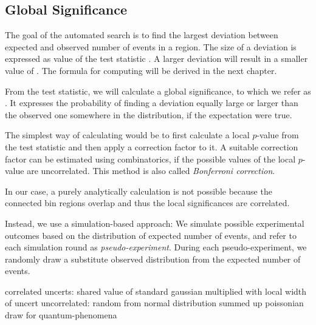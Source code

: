 \subsection{Global Significance}
\label{sec:global_significance}

The goal of the automated search is to find the largest deviation between expected and observed number of events in a region. The size of a deviation is expressed as value of the test statistic \TS. A larger deviation will result in a smaller value of \TS.
The formula for computing \TS will be derived in the next chapter. 

From the test statistic, we will calculate a global significance, to which we refer as \ptilde. It expresses the probability of finding a deviation equally large or larger than the observed one somewhere in the distribution, if the expectation were true.

The simplest way of calculating \ptilde would be to first calculate a local $p$-value from the test statistic and then apply a correction factor to it. A suitable correction factor can be estimated using combinatorics, if the possible values of the local $p$-value are uncorrelated. This method is also called \emph{Bonferroni correction}. 

In our case, a purely analytically calculation is not possible because the connected bin regions overlap and thus the local significances are correlated.

Instead, we use a simulation-based approach:
We simulate possible experimental outcomes based on the distribution of expected number of events, and refer to each simulation round as \emph{pseudo-experiment}.
During each pseudo-experiment, we randomly draw a substitute observed distribution from the expected number of events. 

correlated uncerts: shared value of standard gaussian multiplied with local width of uncert
uncorrelated: random from normal distribution
summed up
poissonian draw for quantum-phenomena

